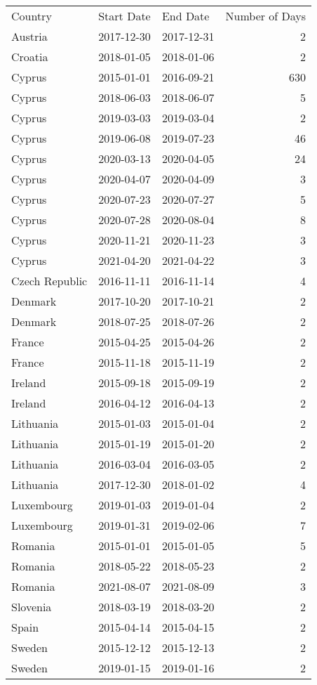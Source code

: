 \begin{tabular}{lllr}
Country & Start Date & End Date & Number of Days \\
Austria & 2017-12-30 & 2017-12-31 & 2 \\
Croatia & 2018-01-05 & 2018-01-06 & 2 \\
Cyprus & 2015-01-01 & 2016-09-21 & 630 \\
Cyprus & 2018-06-03 & 2018-06-07 & 5 \\
Cyprus & 2019-03-03 & 2019-03-04 & 2 \\
Cyprus & 2019-06-08 & 2019-07-23 & 46 \\
Cyprus & 2020-03-13 & 2020-04-05 & 24 \\
Cyprus & 2020-04-07 & 2020-04-09 & 3 \\
Cyprus & 2020-07-23 & 2020-07-27 & 5 \\
Cyprus & 2020-07-28 & 2020-08-04 & 8 \\
Cyprus & 2020-11-21 & 2020-11-23 & 3 \\
Cyprus & 2021-04-20 & 2021-04-22 & 3 \\
Czech Republic & 2016-11-11 & 2016-11-14 & 4 \\
Denmark & 2017-10-20 & 2017-10-21 & 2 \\
Denmark & 2018-07-25 & 2018-07-26 & 2 \\
France & 2015-04-25 & 2015-04-26 & 2 \\
France & 2015-11-18 & 2015-11-19 & 2 \\
Ireland & 2015-09-18 & 2015-09-19 & 2 \\
Ireland & 2016-04-12 & 2016-04-13 & 2 \\
Lithuania & 2015-01-03 & 2015-01-04 & 2 \\
Lithuania & 2015-01-19 & 2015-01-20 & 2 \\
Lithuania & 2016-03-04 & 2016-03-05 & 2 \\
Lithuania & 2017-12-30 & 2018-01-02 & 4 \\
Luxembourg & 2019-01-03 & 2019-01-04 & 2 \\
Luxembourg & 2019-01-31 & 2019-02-06 & 7 \\
Romania & 2015-01-01 & 2015-01-05 & 5 \\
Romania & 2018-05-22 & 2018-05-23 & 2 \\
Romania & 2021-08-07 & 2021-08-09 & 3 \\
Slovenia & 2018-03-19 & 2018-03-20 & 2 \\
Spain & 2015-04-14 & 2015-04-15 & 2 \\
Sweden & 2015-12-12 & 2015-12-13 & 2 \\
Sweden & 2019-01-15 & 2019-01-16 & 2 \\
\end{tabular}
